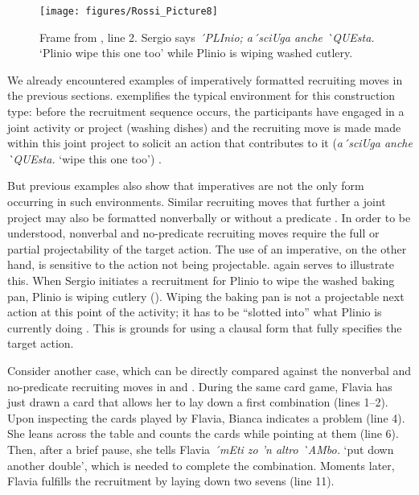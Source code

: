 \documentclass[output=paper,modfonts]{langscibook}
\begin{document}
\begin{figure}
\centering
\texttt{[image: figures/Rossi\_Picture8]} %
\caption{Frame from , line 2. Sergio says \textit{´{}PLInio; a´{}sciUga anche \`{}QUEsta.} ‘Plinio wipe this one too’ while Plinio is wiping washed cutlery.}
\label{fig:rossi:8}
\end{figure}

We already encountered examples of imperatively formatted recruiting moves in the previous sections.  exemplifies the typical environment for this construction type: before the recruitment sequence occurs, the participants have engaged in a joint activity or project (washing dishes) and the recruiting move is made made within this joint project to solicit an action that contributes to it (\textit{a´{}sciUga anche \`{}QUEsta.} ‘wipe this one too’) \citep{Rossi2012}. 

But previous examples also show that imperatives are not the only form occurring in such environments. Similar recruiting moves that further a joint project may also be formatted nonverbally  or without a predicate . In order to be understood, nonverbal and no-predicate recruiting moves require the full or partial projectability of the target action. The use of an imperative, on the other hand, is sensitive to the action not being projectable.  again serves to illustrate this. When Sergio initiates a recruitment for Plinio to wipe the washed baking pan, Plinio is wiping cutlery (). Wiping the baking pan is not a projectable next action at this point of the activity; it has to be “slotted into” what Plinio is currently doing \citep[318]{Rossi2014}. This is grounds for using a clausal form that fully specifies the target action.

Consider another case, which can be directly compared against the nonverbal and no-predicate recruiting moves in  and . During the same card game, Flavia has just drawn a card that allows her to lay down a first combination (lines 1--2). Upon inspecting the cards played by Flavia, Bianca indicates a problem (line 4). She leans across the table and counts the cards while pointing at them (line 6). Then, after a brief pause, she tells Flavia \textit{´{}mEti zo ’n altro \`{}AMbo.} ‘put down another double’, which is needed to complete the combination. Moments later, Flavia fulfills the recruitment by laying down two sevens (line 11).
\end{document}
